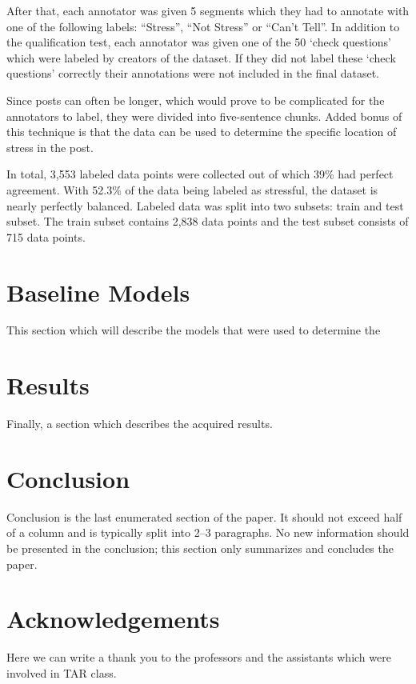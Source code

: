 \documentclass[10pt, a4paper]{article}
\begin{document}
After that, each annotator was given 5 segments which they had to annotate with one of the following labels: ``Stress'', ``Not Stress'' or ``Can't Tell''.
In addition to the qualification test, each annotator was given one of the 50 `check questions' which were labeled by creators of the dataset.
If they did not label these `check questions' correctly their annotations were not included in the final dataset.

Since posts can often be longer, which would prove to be complicated for the annotators to label, they were divided into five-sentence chunks.
Added bonus of this technique is that the data can be used to determine the specific location of stress in the post.

In total, 3,553 labeled data points were collected out of which 39\% had perfect agreement.
With 52.3\% of the data being labeled as stressful, the dataset is nearly perfectly balanced.
Labeled data was split into two subsets: train and test subset.
The train subset contains 2,838 data points and the test subset consists of 715 data points.

\section{Baseline Models}

This section which will describe the models that were used to determine the

\section{Results}

Finally, a section which describes the acquired results.

\section{Conclusion}

Conclusion is the last enumerated section of the paper.
It should not exceed half of a column and is typically split into 2--3 paragraphs.
No new information should be presented in the conclusion; this section only summarizes and concludes the paper.

\section*{Acknowledgements}

Here we can write a thank you to the professors and the assistants which were involved in TAR class.


 
\end{document}
